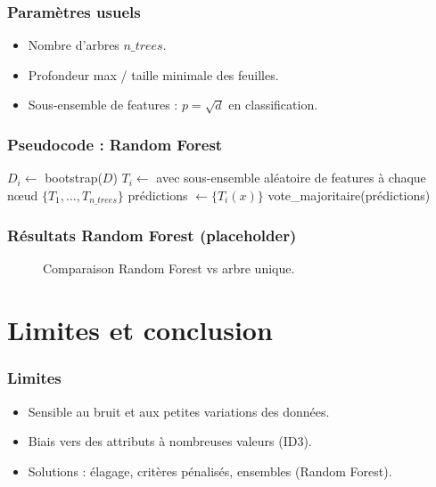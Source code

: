 \documentclass{beamer}
\begin{document}
\begin{frame}
	\frametitle{Paramètres usuels}
	\begin{itemize}
		\item Nombre d'arbres $n\_{trees}$.
		\item Profondeur max / taille minimale des feuilles.
		\item Sous-ensemble de features : $p=\sqrt{d}$ en classification.
	\end{itemize}
\end{frame}

\begin{frame}
	\frametitle{Pseudocode : Random Forest}
	\scriptsize
	\begin{algorithm}[H]
	\caption{Random Forest (classification)}
	\begin{algorithmic}[1]
				\State $D_i \gets$ bootstrap($D$)
				\State $T_i \gets$  avec sous-ensemble aléatoire de features à chaque nœud
			\EndFor
			\State \Return $\{T_1,\dots,T_{n\_{trees}}\}$
		\EndProcedure
		\Statex
			\State prédictions $\gets \{T_i(x)\}$
			\State \Return vote\_majoritaire(prédictions)
		\EndProcedure
	\end{algorithmic}
	\end{algorithm}
\end{frame}

\begin{frame}
	\frametitle{Résultats Random Forest (placeholder)}
	\begin{figure}
		\centering
		\caption{Comparaison Random Forest vs arbre unique.}
	\end{figure}
\end{frame}

\section{Limites et conclusion}

\begin{frame}
	\frametitle{Limites}
	\begin{itemize}
		\item Sensible au bruit et aux petites variations des données.
		\item Biais vers des attributs à nombreuses valeurs (ID3).
		\item Solutions : élagage, critères pénalisés, ensembles (Random Forest).
	\end{itemize}
\end{frame}
\end{document}
